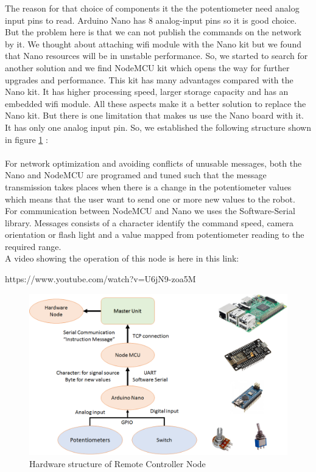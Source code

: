 \documentclass[12pt]{book}
\begin{document}
	\noindent The reason for that choice of components it the the potentiometer need analog input pins to read. Arduino Nano has 8 analog-input pins so it is good choice. But the problem here is that we can not publish the commands on the network by it. We thought about attaching wifi module with the Nano kit but we found that Nano resources will be in unstable performance.
	So, we started to search for another solution and we find NodeMCU kit which opens the way for further upgrades and performance. This kit has many advantages compared with the Nano kit. It has higher processing speed, larger storage capacity and has an embedded wifi module. All these aspects make it a better solution to replace the Nano kit. But there is one limitation that makes us use the Nano board with it. It has only one analog input pin. So, we established the following structure shown in figure \ref{fig:man-controller} :\\ \\
	
	For network optimization and avoiding conflicts of unusable messages, both the Nano and NodeMCU are programed and tuned such that the message transmission takes places when there is a change in the potentiometer values which means that the user want to send one or more new values to the robot. \\
	For communication between NodeMCU and Nano we uses the Software-Serial library. Messages consists of a character identify the command speed, camera orientation or flash light and a value mapped from potentiometer reading to the required range.\\
	A video showing the operation of this node is here in this link:
	\begin{center}
 		https://www.youtube.com/watch?v=U6jN9-zoa5M
	\end{center}
	\begin{figure}
		\centering
		\includegraphics[width =1\textwidth]{Fig/man-controller.png}
		\caption{Hardware structure of Remote Controller Node}
		\label{fig:man-controller}
	\end{figure}
\end{document}
